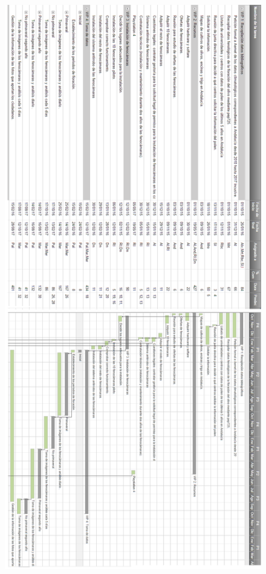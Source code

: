 \documentclass[12pt,oneside,a4paper]{article}
\numberwithin{figure}{section}
\begin{document}
\begin{figure}[H]
\begin{center}
\includegraphics[scale=.45]{Gant3.png}
\end{center}
\end{figure}
\end{document}
